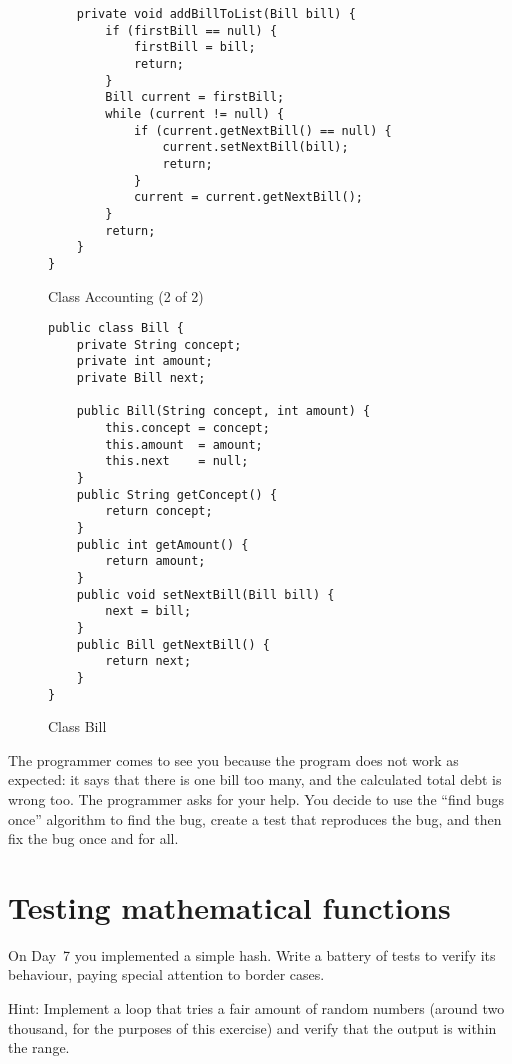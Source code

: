 \documentclass{article}
\begin{document}
\begin{figure}[hbtp]
  \centering
\begin{verbatim}
    private void addBillToList(Bill bill) {
        if (firstBill == null) {
            firstBill = bill;
            return;
        } 
        Bill current = firstBill;
        while (current != null) {
            if (current.getNextBill() == null) {
                current.setNextBill(bill);
                return;
            }
            current = current.getNextBill();
        }
        return;
    }
}
\end{verbatim}
  \caption{Class Accounting (2 of 2)}
  \label{fig:accountinggggg}
\end{figure}

\begin{figure}[hbtp]
  \centering
\begin{verbatim}
public class Bill {
    private String concept;
    private int amount;
    private Bill next;

    public Bill(String concept, int amount) {
        this.concept = concept;
        this.amount  = amount;
        this.next    = null;
    }
    public String getConcept() {
        return concept;
    }
    public int getAmount() {
        return amount;
    }
    public void setNextBill(Bill bill) {
        next = bill;
    }
    public Bill getNextBill() {
        return next;
    }
}
\end{verbatim}
  \caption{Class Bill}
  \label{fig:accountingggggtr}
\end{figure}

The programmer comes to see you because the program does not work as
expected: it says that there is one bill too many, and the calculated
total debt is wrong too. The programmer asks for
your help. You decide to use the ``find bugs once'' algorithm to find
the bug, create a test that reproduces the bug,
and then fix the bug once and for all. 


\section{Testing mathematical functions}
\label{sec:test-math-funct}

On Day~7 you implemented a simple hash. Write a battery of tests to
verify its behaviour, paying special attention to border cases. 

Hint: Implement a loop that tries a fair amount of random numbers
(around two thousand, for the purposes of this exercise) and verify
that the output is within the range. 
\end{document}
